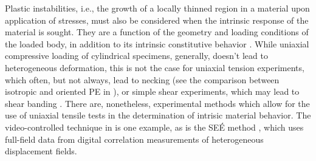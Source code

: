 Plastic instabilities, i.e., the growth of a locally thinned region in a material upon application of stresses, must also be considered when the intrinsic response of the material is sought.
They are a function of the geometry and loading conditions of the loaded body, in addition to its intrinsic constitutive behavior \citep{wardIntroductionMechanicalProperties2004}.
While uniaxial compressive loading of cylindrical specimens, generally, doesn't lead to heterogeneous deformation, this is not the case for uniaxial tension experiments, which often, but not always, lead to necking (see the comparison between isotropic and oriented PE in \cite{naViscousForceDominatedTensileDeformation2006}), or simple shear experiments, which may lead to shear banding \citep{gsellApplicationPlaneSimple1983}.
There are, nonetheless, experimental methods which allow for the use of uniaxial tensile tests in the determination of intrisic material behavior.
The video-controlled technique in \citep{gsellVideocontrolledTensileTesting1992} is one example, as is the SEÉ method \citep{lauroSEEMethodDetermination2010, balieuDamageHighStrain2015}, which uses full-field data from digital correlation measurements of heterogeneous displacement fields.

